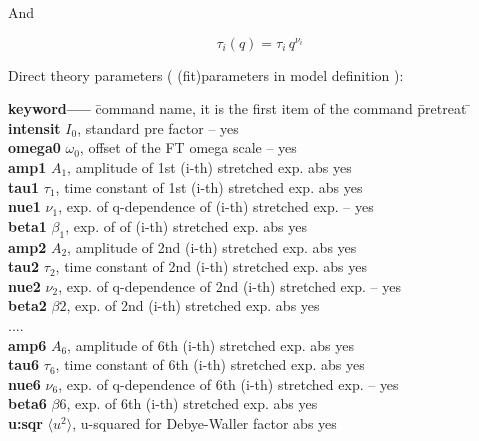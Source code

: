 \documentclass[11pt,fleqn]{book} %
\newcommand{\linespace}{\vspace{4ex}}
\begin{document}
And 

\begin{equation}
 \tau_{i}(q)    = \tau_i \, q^{\nu_{i}} 
\end{equation}

\linespace

Direct theory parameters ( (fit)parameters in model definition ):
\begin{tabbing}
\textbf{keyword-----}  \= command name, it is the first item of the command \= pretreat   \=   \kill     
\textbf{intensit } \>  $I_0$, standard pre factor                                               \>  --  \> yes  \\    
\textbf{omega0   } \>  $\omega_0$, offset of the FT omega scale                                 \>  --  \> yes  \\
\textbf{amp1 }     \>  $A_1$, amplitude of 1st (i-th) stretched exp.                            \>  abs \> yes  \\      
\textbf{tau1 }     \>  $\tau_1$, time constant of  1st (i-th) stretched exp.                    \>  abs \> yes  \\
\textbf{nue1 }     \>  $\nu_1$, exp. of q-dependence of  (i-th) stretched exp.              \>  --  \> yes  \\
\textbf{beta1 }    \>  $\beta_1$, exp. of of  (i-th) stretched exp.  \>  abs \> yes  \\
\textbf{amp2 }     \>  $A_2$, amplitude of 2nd (i-th) stretched exp.                            \>  abs \> yes  \\      
\textbf{tau2 }     \>  $\tau_2$, time constant of  2nd (i-th) stretched exp.                    \>  abs \> yes  \\
\textbf{nue2 }     \>  $\nu_2$, exp. of q-dependence of 2nd (i-th) stretched exp.           \>  --  \> yes  \\
\textbf{beta2 }    \>  $\beta2$, exp. of  2nd (i-th) stretched exp.\>  abs \> yes  \\
.... \\
\textbf{amp6 }     \>  $A_6$, amplitude of 6th (i-th) stretched exp.                            \>  abs \> yes  \\      
\textbf{tau6 }     \>  $\tau_6$, time constant of  6th (i-th) stretched exp.                    \>  abs \> yes  \\
\textbf{nue6 }     \>  $\nu_6$, exp. of q-dependence of 6th (i-th) stretched exp.           \>  --  \> yes  \\
\textbf{beta6 }    \>  $\beta6$, exp. of 6th (i-th) stretched exp.\>  abs \> yes  \\
\textbf{u:sqr }    \>  $\langle u^2 \rangle$, u-squared for Debye-Waller factor                 \>  abs \> yes  \\

\end{tabbing}
\end{document}
